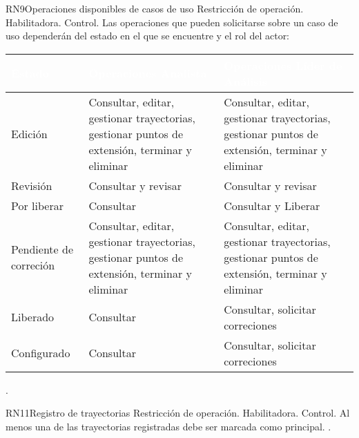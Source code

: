 \begin{BussinesRule}{RN9}{Operaciones disponibles de casos de uso} 
	\BRitem[Tipo:] Restricción de operación. 
	\BRitem[Clase:] Habilitadora. 
	\BRitem[Nivel:] Control. %
	\BRitem[Descripción:] Las operaciones que pueden solicitarse sobre un caso de uso dependerán del estado en el que se encuentre y el rol del actor:
	
	\begin{table}[H]
		\centering
		\begin{tabular}{|p{5cm}| p{5cm}| p{5cm}|}
			\hline
			\rowcolor{blue} \textcolor{white}{\textbf{Estado}} & \textcolor{white}{\textbf{Operaciones Analista}} & \textcolor{white}{\textbf{Operaciones Líder de Análisis}} \\
			\hline
			Edición & Consultar, editar, gestionar trayectorias, gestionar puntos de extensión, terminar y eliminar & Consultar, editar, gestionar trayectorias, gestionar puntos de extensión, terminar y eliminar \\
			\hline
			Revisión & Consultar y revisar & Consultar y revisar\\
			\hline
			Por liberar & Consultar & Consultar y Liberar\\
			\hline
			Pendiente de correción & Consultar, editar, gestionar trayectorias, gestionar puntos de extensión, terminar y eliminar & Consultar, editar, gestionar trayectorias, gestionar puntos de extensión, terminar y eliminar\\
			\hline
			Liberado & Consultar & Consultar, solicitar correciones\\
			\hline
			Configurado & Consultar & Consultar, solicitar correciones\\
			\hline
		\end{tabular}
	\end{table}

	 \UCref{}{}.
	
\end{BussinesRule}

	\begin{BussinesRule}{RN11}{Registro de trayectorias} 
		\BRitem[Tipo:] Restricción de operación. 
		\BRitem[Clase:] Habilitadora. 
		\BRitem[Nivel:] Control. %
		\BRitem[Descripción:] Al menos una de las trayectorias registradas debe ser marcada como principal.
		 \UCref{}{}. 
	\end{BussinesRule}

